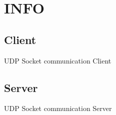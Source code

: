 \hypertarget{index_info}{}\section{I\-N\-F\-O}\label{index_info}
\hypertarget{index_Client}{}\subsection{Client}\label{index_Client}
U\-D\-P Socket communication Client \hypertarget{index_Server}{}\subsection{Server}\label{index_Server}
U\-D\-P Socket communication Server 